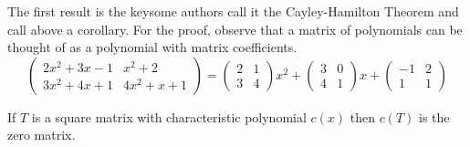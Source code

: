 The first result is the key\Dash some authors call it the Cayley-Hamilton
Theorem and call  above a corollary.
For the proof, observe that
a matrix of polynomials can be thought of as a polynomial with
matrix coefficients.
\begin{equation*}
   \begin{pmatrix}
     2x^2+3x-1  &x^2+2    \\
     3x^2+4x+1  &4x^2+x+1
   \end{pmatrix}
 = \begin{pmatrix}
    2  &1  \\
    3  &4
  \end{pmatrix}x^2
 + \begin{pmatrix}
    3  &0  \\
    4  &1
  \end{pmatrix}x
 + \begin{pmatrix}
   -1  &2  \\
    1  &1
  \end{pmatrix}
\end{equation*}

\begin{lemma}   \label{le:MatSatItsCharPoly}
If \( T \) is a square matrix with characteristic polynomial \( c(x) \)
then \( c(T) \) is the zero matrix.
\end{lemma}


